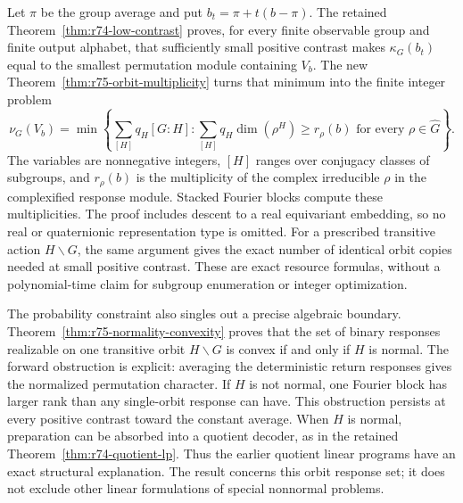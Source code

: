 Let $\pi$ be the group average and put $b_t=\pi+t(b-\pi)$.
The retained Theorem~\ref{thm:r74-low-contrast} proves, for every finite
observable group and finite output alphabet, that sufficiently small
positive contrast makes $\kappa_G(b_t)$ equal to the smallest permutation
module containing $V_b$. The new Theorem~\ref{thm:r75-orbit-multiplicity}
turns that minimum into the finite integer problem
\[
 \nu_G(V_b)=\min\left\{\sum_{[H]}q_H[G:H]:
   \sum_{[H]}q_H\dim(\rho^H)\ge r_\rho(b)
   \text{ for every }\rho\in\widehat G\right\}.
\]
The variables are nonnegative integers, $[H]$ ranges over conjugacy classes
of subgroups, and $r_\rho(b)$ is the multiplicity of the complex irreducible
$\rho$ in the complexified response module. Stacked Fourier blocks compute
these multiplicities. The proof includes descent to a real equivariant
embedding, so no real or quaternionic representation type is omitted.
For a prescribed transitive action $H\backslash G$, the same argument gives
the exact number of identical orbit copies needed at small positive
contrast. These are exact resource formulas, without a polynomial-time
claim for subgroup enumeration or integer optimization.

The probability constraint also singles out a precise algebraic boundary.
Theorem~\ref{thm:r75-normality-convexity} proves that the set of binary
responses realizable on one transitive orbit $H\backslash G$ is convex if
and only if $H$ is normal. The forward obstruction is explicit: averaging
the deterministic return responses gives the normalized permutation
character. If $H$ is not normal, one Fourier block has larger rank than
any single-orbit response can have. This obstruction persists at every
positive contrast toward the constant average. When $H$ is normal,
preparation can be absorbed into a quotient decoder, as in the retained
Theorem~\ref{thm:r74-quotient-lp}. Thus the earlier quotient linear programs
have an exact structural explanation. The result concerns this orbit
response set; it does not exclude other linear formulations of special
nonnormal problems.

